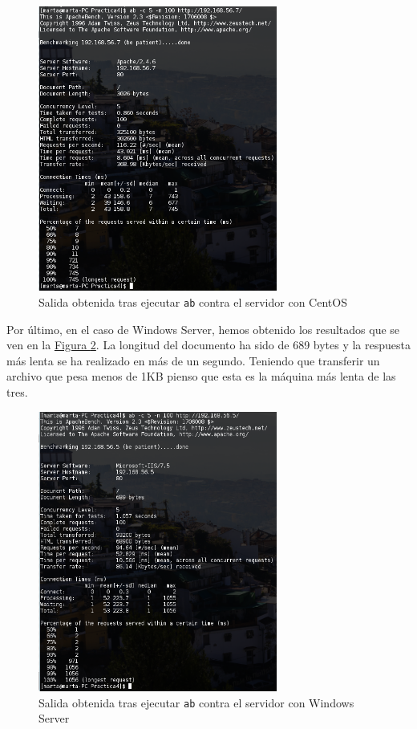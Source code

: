 \documentclass[10pt,a4paper,spanish]{article}
\numberwithin{equation}{section} %
\numberwithin{figure}{section} %
\numberwithin{table}{section} %
\begin{document}
\begin{figure}[!h]
    \centering
    \includegraphics[width=0.7\textwidth]{7}
    \caption{Salida obtenida tras ejecutar \texttt{ab} contra el servidor con CentOS}
    \label{abcentos}
\end{figure}

Por último, en el caso de Windows Server, hemos obtenido los resultados que se ven en la \hyperref[abwindows]{Figura \ref*{abwindows}}. La longitud del documento ha sido de 689 bytes y la respuesta más lenta se ha realizado en más de un segundo. Teniendo que transferir un archivo que pesa menos de 1KB pienso que esta es la máquina más lenta de las tres. 

\begin{figure}[!h]
    \centering
    \includegraphics[width=0.7\textwidth]{8}
    \caption{Salida obtenida tras ejecutar \texttt{ab} contra el servidor con Windows Server}
    \label{abwindows}
\end{figure}
\end{document}
